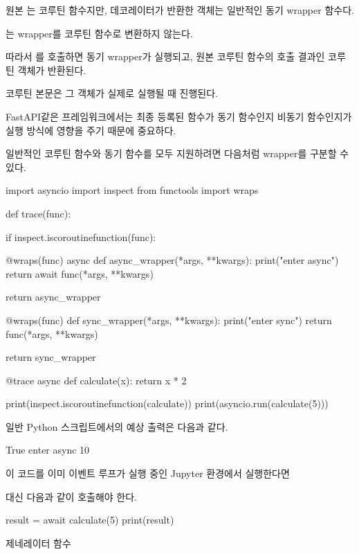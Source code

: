 원본 는 코루틴 함수지만, 데코레이터가 반환한 객체는 일반적인 동기 wrapper 함수다.

는 wrapper를 코루틴 함수로 변환하지 않는다.

따라서 를 호출하면 동기 wrapper가 실행되고, 원본 코루틴 함수의 호출 결과인 코루틴 객체가 반환된다.

코루틴 본문은 그 객체가 실제로 실행될 때 진행된다.

FastAPI같은 프레임워크에서는 최종 등록된 함수가 동기 함수인지 비동기 함수인지가 실행 방식에 영향을 주기 때문에 중요하다.

일반적인 코루틴 함수와 동기 함수를 모두 지원하려면 다음처럼 wrapper를 구분할 수 있다.

\begin{dhkcode}
import asyncio
import inspect
from functools import wraps


def trace(func):

    if inspect.iscoroutinefunction(func):

        @wraps(func)
        async def async_wrapper(*args, **kwargs):
            print("enter async")
            return await func(*args, **kwargs)

        return async_wrapper

    @wraps(func)
    def sync_wrapper(*args, **kwargs):
        print("enter sync")
        return func(*args, **kwargs)

    return sync_wrapper


@trace
async def calculate(x):
    return x * 2


print(inspect.iscoroutinefunction(calculate))
print(asyncio.run(calculate(5)))
\end{dhkcode}

일반 Python 스크립트에서의 예상 출력은 다음과 같다.

\begin{dhkzsh}
True
enter async
10
\end{dhkzsh}

이 코드를 이미 이벤트 루프가 실행 중인 Jupyter 환경에서 실행한다면

 대신 다음과 같이 호출해야 한다.

\begin{dhkcode}
result = await calculate(5)
print(result)
\end{dhkcode}

\begin{dhknote}
\begin{dhksmry}[centered]
제네레이터 함수
\end{dhksmry}
\end{dhknote}

